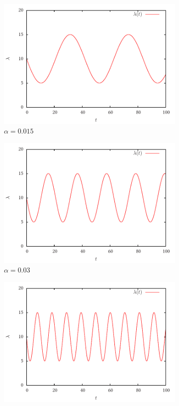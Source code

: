 \documentclass[a4paper,11pt]{article}
\begin{document}
\begin{figure}
\begin{subfigure}{0.5\textwidth}
\includegraphics[width=\textwidth]{prelim_sine_015}
\caption{$\alpha=0.015$}
\end{subfigure}
\begin{subfigure}{0.5\textwidth}
\includegraphics[width=\textwidth]{prelim_sine_03}
\caption{$\alpha=0.03$}
\end{subfigure}
\begin{center}
\begin{subfigure}{0.5\textwidth}
\includegraphics[width=\textwidth]{prelim_sine_06}

\end{subfigure}
\end{center}
\end{figure}
\end{document}
